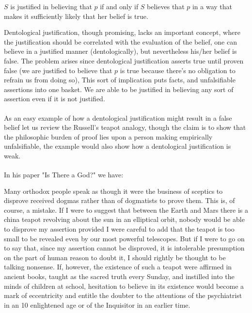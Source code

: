 \documentclass[10pt,a4paper]{article}
\begin{document}
                    \begin{define}
                        $S$ is justified in believing that $p$ if and only if $S$ believes that $p$ in a way that makes it sufficiently likely that her belief is true.
                    \end{define}
                    Dentological justification, though promising, lacks an important concept, where the justification should be correlated with the evaluation of the belief, one can believe in a justified manner (dentologically), but nevertheless his/her belief is false. The problem arises since dentological justification asserts true until proven false (we are justified to believe that $p$ is true because there's no obligation to refrain us from doing so), This sort of implication puts facts, and unfalsifiable assertions into one basket. We are able to be justified in believing any sort of assertion even if it is not justified.\cite{sep-epistemology}
                    \\
                    \\
                    As an easy example of how a dentological justification might result in a false belief let us review the Russell's teapot analogy, though the claim is to show that the philosophic burden of proof lies upon a person making empirically unfalsifiable, the example would also show how a dentological justification is weak. \cite{enwiki:1149010951}
                    \\
                    \\
                    In his paper "Is There a God?" we have:
                    \begin{qt}
                        Many orthodox people speak as though it were the business of sceptics to disprove received dogmas rather than of dogmatists to prove them. This is, of course, a mistake. If I were to suggest that between the Earth and Mars there is a china teapot revolving about the sun in an elliptical orbit, nobody would be able to disprove my assertion provided I were careful to add that the teapot is too small to be revealed even by our most powerful telescopes. But if I were to go on to say that, since my assertion cannot be disproved, it is intolerable presumption on the part of human reason to doubt it, I should rightly be thought to be talking nonsense. If, however, the existence of such a teapot were affirmed in ancient books, taught as the sacred truth every Sunday, and instilled into the minds of children at school, hesitation to believe in its existence would become a mark of eccentricity and entitle the doubter to the attentions of the psychiatrist in an 10 enlightened age or of the Inquisitor in an earlier time.
                    \end{qt}
\end{document}
